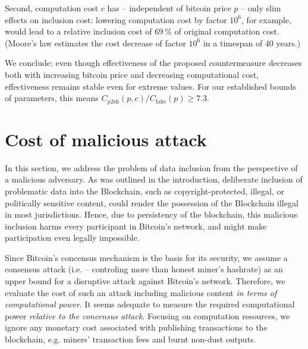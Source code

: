 \documentclass[10pt,a4paper,twocolumn]{article}
\begin{document}
Second, computation cost $c$ has – independent of bitcoin price $p$ – only slim effects on inclusion cost: lowering computation cost by factor $10^6$, for example, would lead to a relative inclusion cost of $\SI{69}{\percent}$ of original computation cost. (Moore's law estimates the cost decrease of factor $10^6$ in a timespan of 40 years.)

We conclude: even though effectiveness of the proposed countermeasure decreases both with increasing bitcoin price and decreasing computational cost, effectiveness remains stable even for extreme values.
For our established bounds of parameters, this means $C_\mathrm{p2sh}(p,c) / C_\mathrm{fake}(p) \geq \num{7.3}$.








\section{Cost of malicious attack}

In this section, we address the problem of data inclusion from the perspective of a malicious adversary.
As was outlined in the introduction, deliberate inclusion of problematic data into the Blockchain, such as copyright-protected, illegal, or politically sensitive content, could render the possession of the Blockchain illegal in most jurisdictions.
Hence, due to persistency of the blockchain, this malicious inclusion harms every participant in Bitcoin's network, and might make participation even legally impossible.

Since Bitcoin's concensus mechanism is the basis for its security, we assume a consensus attack (i.e.  – controling more than honest miner's hashrate) as an upper bound for a disruptive attack against Bitcoin's network.
Therefore, we evaluate the cost of such an attack including malicious content \emph{in terms of computational power}.
It seems adequate to measure the required computational power \emph{relative to the concensus attack}.
Focusing on computation resources, we ignore any monetary cost associated with publishing transactions to the blockchain, e.g. miners' transaction fees and burnt non-dust outputs.
\end{document}

